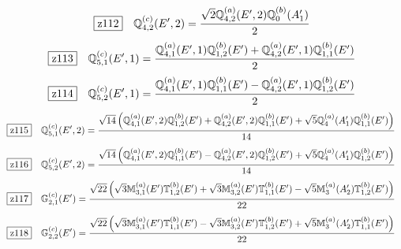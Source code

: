 \documentclass[fleqn,10pt,landscape]{jsarticle}
\begin{document}
\begin{dmath*}
\hspace*{3mm}\fbox{z112}\quad \mathbb{Q}_{4,2}^{(c)}(E^{\prime},2)=\frac{\sqrt{2} \mathbb{Q}_{4,2}^{(a)}(E^{\prime},2) \mathbb{Q}_{0}^{(b)}(A_{1}^{\prime})}{2}
\end{dmath*}
\begin{dmath*}
\hspace*{3mm}\fbox{z113}\quad \mathbb{Q}_{5,1}^{(c)}(E^{\prime},1)=\frac{\mathbb{Q}_{4,1}^{(a)}(E^{\prime},1) \mathbb{Q}_{1,2}^{(b)}(E^{\prime}) + \mathbb{Q}_{4,2}^{(a)}(E^{\prime},1) \mathbb{Q}_{1,1}^{(b)}(E^{\prime})}{2}
\end{dmath*}
\begin{dmath*}
\hspace*{3mm}\fbox{z114}\quad \mathbb{Q}_{5,2}^{(c)}(E^{\prime},1)=\frac{\mathbb{Q}_{4,1}^{(a)}(E^{\prime},1) \mathbb{Q}_{1,1}^{(b)}(E^{\prime}) - \mathbb{Q}_{4,2}^{(a)}(E^{\prime},1) \mathbb{Q}_{1,2}^{(b)}(E^{\prime})}{2}
\end{dmath*}
\begin{dmath*}
\hspace*{3mm}\fbox{z115}\quad \mathbb{Q}_{5,1}^{(c)}(E^{\prime},2)=\frac{\sqrt{14} \left(\mathbb{Q}_{4,1}^{(a)}(E^{\prime},2) \mathbb{Q}_{1,2}^{(b)}(E^{\prime}) + \mathbb{Q}_{4,2}^{(a)}(E^{\prime},2) \mathbb{Q}_{1,1}^{(b)}(E^{\prime}) + \sqrt{5} \mathbb{Q}_{4}^{(a)}(A_{1}^{\prime}) \mathbb{Q}_{1,1}^{(b)}(E^{\prime})\right)}{14}
\end{dmath*}
\begin{dmath*}
\hspace*{3mm}\fbox{z116}\quad \mathbb{Q}_{5,2}^{(c)}(E^{\prime},2)=\frac{\sqrt{14} \left(\mathbb{Q}_{4,1}^{(a)}(E^{\prime},2) \mathbb{Q}_{1,1}^{(b)}(E^{\prime}) - \mathbb{Q}_{4,2}^{(a)}(E^{\prime},2) \mathbb{Q}_{1,2}^{(b)}(E^{\prime}) + \sqrt{5} \mathbb{Q}_{4}^{(a)}(A_{1}^{\prime}) \mathbb{Q}_{1,2}^{(b)}(E^{\prime})\right)}{14}
\end{dmath*}
\begin{dmath*}
\hspace*{3mm}\fbox{z117}\quad \mathbb{G}_{2,1}^{(c)}(E^{\prime})=\frac{\sqrt{22} \left(\sqrt{3} \mathbb{M}_{3,1}^{(a)}(E^{\prime}) \mathbb{T}_{1,2}^{(b)}(E^{\prime}) + \sqrt{3} \mathbb{M}_{3,2}^{(a)}(E^{\prime}) \mathbb{T}_{1,1}^{(b)}(E^{\prime}) - \sqrt{5} \mathbb{M}_{3}^{(a)}(A_{2}^{\prime}) \mathbb{T}_{1,2}^{(b)}(E^{\prime})\right)}{22}
\end{dmath*}
\begin{dmath*}
\hspace*{3mm}\fbox{z118}\quad \mathbb{G}_{2,2}^{(c)}(E^{\prime})=\frac{\sqrt{22} \left(\sqrt{3} \mathbb{M}_{3,1}^{(a)}(E^{\prime}) \mathbb{T}_{1,1}^{(b)}(E^{\prime}) - \sqrt{3} \mathbb{M}_{3,2}^{(a)}(E^{\prime}) \mathbb{T}_{1,2}^{(b)}(E^{\prime}) + \sqrt{5} \mathbb{M}_{3}^{(a)}(A_{2}^{\prime}) \mathbb{T}_{1,1}^{(b)}(E^{\prime})\right)}{22}
\end{dmath*}
\end{document}
